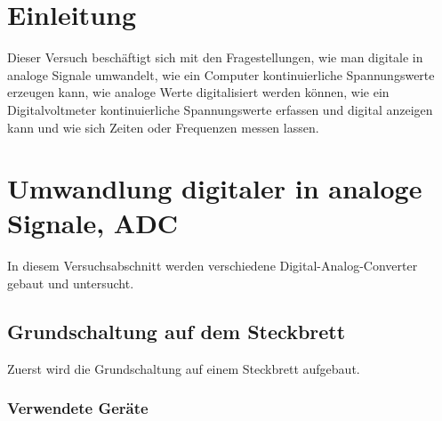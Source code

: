\documentclass[12pt,a4paper]{article}
\begin{document}
\newpage
\tableofcontents
\newpage
\section{Einleitung}

Dieser Versuch beschäftigt sich mit den Fragestellungen, wie man digitale in analoge Signale umwandelt, wie ein Computer kontinuierliche Spannungswerte erzeugen kann, wie analoge Werte digitalisiert werden können, wie ein Digitalvoltmeter kontinuierliche Spannungswerte erfassen und digital anzeigen kann und wie sich Zeiten oder Frequenzen messen lassen.

\section{Umwandlung digitaler in analoge Signale, ADC}

In diesem Versuchsabschnitt werden verschiedene Digital-Analog-Converter gebaut und untersucht.

\subsection{Grundschaltung auf dem Steckbrett}

Zuerst wird die Grundschaltung auf einem Steckbrett aufgebaut.

\subsubsection*{Verwendete Geräte}
\end{document}
